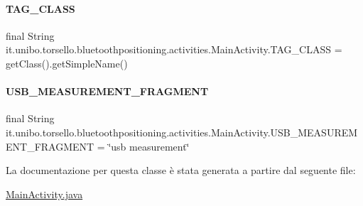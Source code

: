 \paragraph{\texorpdfstring{T\+A\+G\+\_\+\+C\+L\+A\+SS}{TAG\_CLASS}}
{\footnotesize\ttfamily final String it.\+unibo.\+torsello.\+bluetoothpositioning.\+activities.\+Main\+Activity.\+T\+A\+G\+\_\+\+C\+L\+A\+SS = get\+Class().get\+Simple\+Name()\hspace{0.3cm}{\ttfamily [private]}}

\hypertarget{classit_1_1unibo_1_1torsello_1_1bluetoothpositioning_1_1activities_1_1MainActivity_a64bac06e6db556ba1e36c8773e61137b_a64bac06e6db556ba1e36c8773e61137b}{}\label{classit_1_1unibo_1_1torsello_1_1bluetoothpositioning_1_1activities_1_1MainActivity_a64bac06e6db556ba1e36c8773e61137b_a64bac06e6db556ba1e36c8773e61137b} 
\paragraph{\texorpdfstring{U\+S\+B\+\_\+\+M\+E\+A\+S\+U\+R\+E\+M\+E\+N\+T\+\_\+\+F\+R\+A\+G\+M\+E\+NT}{USB\_MEASUREMENT\_FRAGMENT}}
{\footnotesize\ttfamily final String it.\+unibo.\+torsello.\+bluetoothpositioning.\+activities.\+Main\+Activity.\+U\+S\+B\+\_\+\+M\+E\+A\+S\+U\+R\+E\+M\+E\+N\+T\+\_\+\+F\+R\+A\+G\+M\+E\+NT = \char`\"{}usb measurement\char`\"{}\hspace{0.3cm}{\ttfamily [static]}}



La documentazione per questa classe è stata generata a partire dal seguente file\+:\begin{DoxyCompactItemize}
\item 
\hyperlink{MainActivity_8java}{Main\+Activity.\+java}\end{DoxyCompactItemize}
